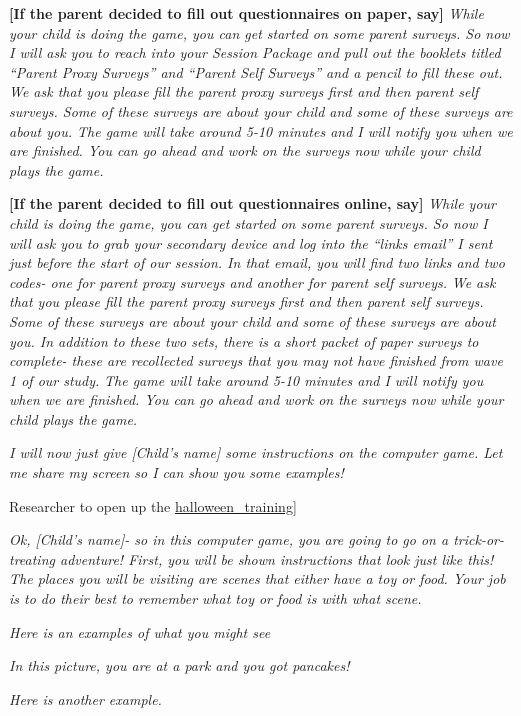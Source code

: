 \documentclass[
]{book}
\begin{document}
\textbf{{[}If the parent decided to fill out questionnaires on paper, say{]}}
\emph{While your child is doing the game, you can get started on some parent surveys. So now I will ask you to reach into your Session Package and pull out the booklets titled ``Parent Proxy Surveys'' and ``Parent Self Surveys'' and a pencil to fill these out.}
\emph{We ask that you please fill the parent proxy surveys first and then parent self surveys. Some of these surveys are about your child and some of these surveys are about you. The game will take around 5-10 minutes and I will notify you when we are finished. You can go ahead and work on the surveys now while your child plays the game.}

\textbf{{[}If the parent decided to fill out questionnaires online, say{]}}
\emph{While your child is doing the game, you can get started on some parent surveys. So now I will ask you to grab your secondary device and log into the ``links email'' I sent just before the start of our session. In that email, you will find two links and two codes- one for parent proxy surveys and another for parent self surveys.}
\emph{We ask that you please fill the parent proxy surveys first and then parent self surveys. Some of these surveys are about your child and some of these surveys are about you. In addition to these two sets, there is a short packet of paper surveys to complete- these are recollected surveys that you may not have finished from wave 1 of our study.}
\emph{The game will take around 5-10 minutes and I will notify you when we are finished. You can go ahead and work on the surveys now while your child plays the game.}

\emph{I will now just give {[}Child's name{]} some instructions on the computer game. Let me share my screen so I can show you some examples!}

Researcher to open up the \href{https://app.box.com/file/784726680410}{halloween\_training}{]}

\emph{Ok, {[}Child's name{]}- so in this computer game, you are going to go on a trick-or-treating adventure! First, you will be shown instructions that look just like this! The places you will be visiting are scenes that either have a toy or food. Your job is to do their best to remember what toy or food is with what scene.}

\emph{Here is an examples of what you might see}

\emph{In this picture, you are at a park and you got pancakes!}

\emph{Here is another example.}
\end{document}
